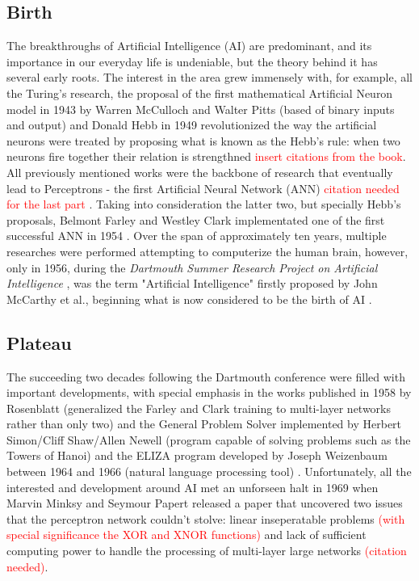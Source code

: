 \documentclass[12pt]{article}
\newcommand{\red}[1]{\textcolor{red}{#1}} %
\begin{document}
\subsection{Birth}
\par The breakthroughs of Artificial Intelligence (AI) are predominant, and its importance in our everyday life is undeniable, but the theory behind it has several early roots. The interest in the area grew immensely with, for example, all the Turing's research, the proposal of the first mathematical Artificial Neuron model in 1943 by Warren McCulloch and Walter Pitts (based of binary inputs and output) \autocite{LogicalCalculusIdeas} and Donald Hebb in 1949 revolutionized the way the artificial neurons were treated by proposing what is known as the Hebb's rule: when two neurons fire together their relation is strengthned \red{insert citations from the book}. All previously mentioned works were the backbone of research that eventually lead to Perceptrons - the first Artificial Neural Network (ANN) \red{citation needed for the last part} \autocite{zhangStudyArtificialIntelligence2021}. Taking into consideration the latter two, but specially Hebb's proposals, Belmont Farley and Westley Clark implementated one of the first successful ANN in 1954 \autocite{farleySimulationSelforganizingSystems1954}. Over the span of approximately ten years, multiple researches were performed attempting to computerize the human brain, however, only in 1956, during the \textit{Dartmouth Summer Research Project on Artificial Intelligence} \autocite{mccarthyPROPOSALDARTMOUTHSUMMER}, was the term "Artificial Intelligence" firstly proposed by John McCarthy et al., beginning what is now considered to be the birth of AI \autocite{zhangStudyArtificialIntelligence2021}.

\subsection{Plateau}
\par The succeeding two decades following the Dartmouth conference were filled with important developments, with special emphasis in the works published in 1958 by Rosenblatt (generalized the Farley and Clark training to multi-layer networks rather than only two) \autocite{liSurveyConvolutionalNeural2020} and the General Problem Solver implemented by Herbert Simon/Cliff Shaw/Allen Newell (program capable of solving problems such as the Towers of Hanoi) \autocite{universityReportGeneralProblemSolving} and the ELIZA program developed by Joseph Weizenbaum between 1964 and 1966 (natural language processing tool) \autocite{weizenbaumELIZAComputerProgram1966}. Unfortunately, all the interested and development around AI met an unforseen halt in 1969 when Marvin Minksy and Seymour Papert released a paper that uncovered two issues that the perceptron network couldn't stolve: linear inseperatable problems \red{(with special significance the XOR and XNOR functions)} and lack of sufficient computing power to handle the processing of multi-layer large networks \red{(citation needed)}.
\end{document}
